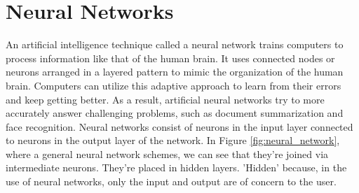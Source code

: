 \section{Neural Networks}
An artificial intelligence technique called a neural network trains computers to process information like that of the human brain. It uses connected nodes or neurons arranged in a layered pattern to mimic the organization of the human brain. Computers can utilize this adaptive approach to learn from their errors and keep getting better. As a result, artificial neural networks try to more accurately answer challenging problems, such as document summarization and face recognition.
\newline Neural networks consist of neurons in the input layer connected to neurons in the output layer of the network. In Figure \ref{fig:neural_network}, where a general neural network schemes, we can see that they're joined via intermediate neurons. They're placed in hidden layers. 'Hidden' because, in the use of neural networks, only the input and output are of concern to the user. 



